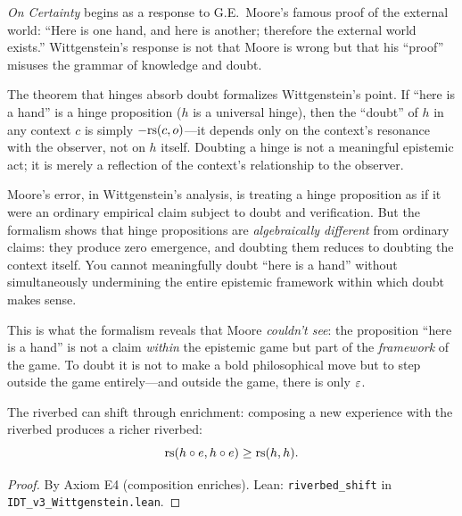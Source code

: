 \begin{interpretation}
\label{interp:moores-hands}
\textit{On Certainty} begins as a response to G.E.~Moore's famous proof
of the external world: ``Here is one hand, and here is another; therefore
the external world exists.'' Wittgenstein's response is not that Moore is
wrong but that his ``proof'' misuses the grammar of knowledge and doubt.

The theorem that hinges absorb doubt formalizes Wittgenstein's point. If
``here is a hand'' is a hinge proposition ($h$ is a universal hinge), then
the ``doubt'' of $h$ in any context $c$ is simply $-\mathrm{rs}(c, o)$---it depends
only on the context's resonance with the observer, not on $h$ itself.
Doubting a hinge is not a meaningful epistemic act; it is merely a reflection
of the context's relationship to the observer.

Moore's error, in Wittgenstein's analysis, is treating a hinge proposition
as if it were an ordinary empirical claim subject to doubt and verification.
But the formalism shows that hinge propositions are \emph{algebraically
different} from ordinary claims: they produce zero emergence, and doubting
them reduces to doubting the context itself. You cannot meaningfully doubt
``here is a hand'' without simultaneously undermining the entire epistemic
framework within which doubt makes sense.

This is what the formalism reveals that Moore \emph{couldn't see}: the
proposition ``here is a hand'' is not a claim \emph{within} the epistemic
game but part of the \emph{framework} of the game. To doubt it is not to
make a bold philosophical move but to step outside the game entirely---and
outside the game, there is only $\varepsilon$.
\end{interpretation}

\begin{theorem}
\label{thm:riverbed-shift}
The riverbed can shift through enrichment: composing a new experience with
the riverbed produces a richer riverbed:
\[
\mathrm{rs}(h \circ e, h \circ e) \geq \mathrm{rs}(h, h).
\]
\end{theorem}

\begin{proof}
By Axiom E4 (composition enriches).
Lean: \texttt{riverbed\_shift} in \texttt{IDT\_v3\_Wittgenstein.lean}.
\end{proof}


